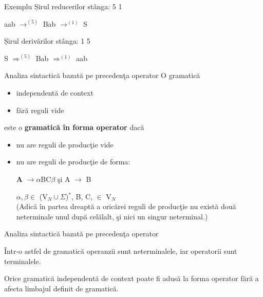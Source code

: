 \documentclass[pdf]{beamer}
\begin{document}
\begin{frame}{Exemplu}
Șirul reducerilor stânga: 5 1 

aab $\rightarrow^{(5)}$ Bab  $\rightarrow^{(1)}$ S 
\newline

Șirul derivărilor stânga: 1 5 

S $\Rightarrow^{(5)}$ Bab  $\Rightarrow^{(1)}$ aab 
\end{frame}



\begin{frame}{Analiza sintactică bazată pe precedenţa operator}
O gramatică
\begin{itemize}
\item
independentă de context
\item
fără reguli vide
\end{itemize}
este o \textbf{gramatică în forma operator} dacă 
\begin{itemize}
\item
nu are reguli de producţie vide
\item
nu are reguli de producţie de forma:

\begin{center}
\textbf A $\to \alpha$BC$\beta$ şi A $\to$ B
\end{center} 
$\alpha, \beta \in$ (V$_{N}\cup\Sigma$)$^{*}$, B, C, $\in$ V$_{N}$ \\

(Adică în partea dreaptă a oricărei reguli de producţie nu există două neterminale unul după celălalt, şi nici un singur neterminal.)
\end{itemize}
\end{frame}



\begin{frame}{Analiza sintactică bazată pe precedenţa operator}

Într-o astfel de gramatică operanzii sunt neterminalele, iar operatorii sunt terminalele.
\newline

Orice gramatică independentă de context poate fi adusă la forma operator fără a afecta limbajul definit de gramatică.
\end{frame}
\end{document}
